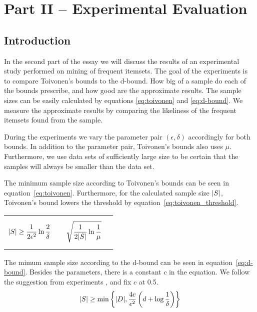 \documentclass[../main.tex]{subfiles}
\begin{document}

\section*{Part II -- Experimental Evaluation}
\setcounter{section}{2}
\setcounter{subsection}{0}

\subsection{Introduction}
\label{sec:II_intro}

In the second part of the essay we will discuss the results of an experimental study performed on mining of frequent itemsets.
The goal of the experiments is to compare Toivonen's bounds to the d-bound.
How big of a sample do each of the bounds prescribe, and how good are the approximate results.
The sample sizes can be easily calculated by equations \ref{eq:toivonen} and \ref{eq:d-bound}.
We measure the approximate results by comparing the likeliness of the frequent itemsets found from the sample.


During the experiments we vary the parameter pair $(\epsilon, \delta)$ accordingly for both bounds.
In addition to the parameter pair, Toivonen's bounds also uses $\mu$.
Furthermore, we use data sets of sufficiently large size to be certain that the samples will always be smaller than the data set.


The minimum sample size according to Toivonen's bounds can be seen in equation~\ref{eq:toivonen}.
Furthermore, for the calculated sample size $\lvert S\rvert$, Toivonen's bound lowers the threshold by equation~\ref{eq:toivonen_threshold}.

\begin{tabularx}{\textwidth}{X X}
    {\begin{align} \label{eq:toivonen}
        &\lvert S\rvert \ge \frac{1}{2\epsilon^{2}} \ln \frac{2}{\delta}
    \end{align}}
     & 
    {\begin{align} \label{eq:toivonen_threshold}
        &\sqrt{\frac{1}{2\lvert S\rvert}\ln\frac{1}{\mu}}
    \end{align}}
\end{tabularx}

The mimum sample size according to the d-bound can be seen in equation~\ref{eq:d-bound}.
Besides the parameters, there is a constant $c$ in the equation.
We follow the suggestion from \citeauthor{Riondato2012} experiments \cite{Riondato2012}, and fix $c$ at \num{0.5}.
\begin{align} \label{eq:d-bound}
    \lvert S\rvert \ge \min \left\{ \lvert D\rvert, \frac{4c}{\epsilon^{2}}\left( d + \log \frac{1}{\delta} \right) \right\}
\end{align}
\end{document}
